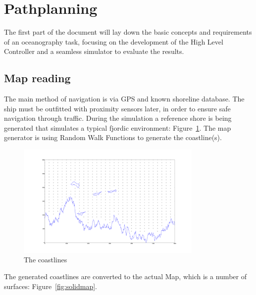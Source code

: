 \section{Pathplanning} 

The first part of the document will lay down the basic concepts and requirements of an oceanography task, focusing on the development of the High Level Controller and a seamless simulator to evaluate the results.

\subsection{Map reading}

The main method of navigation is via GPS and known shoreline database. The ship must be outfitted with proximity sensors later, in order to ensure safe navigation through traffic. During the simulation a reference shore is being generated that simulates a typical fjordic environment: Figure~\ref{fig:linemap}. The map generator is using Random Walk Functions to generate the coastline(s).

\begin{figure}[H]
	\centering
	\includegraphics[width=0.8\textwidth]{img/linemap}
	\caption{The coastlines}
	\label{fig:linemap}
\end{figure}

The generated coastlines are converted to the actual Map, which is a number of surfaces: Figure~\ref{fig:solidmap}.

